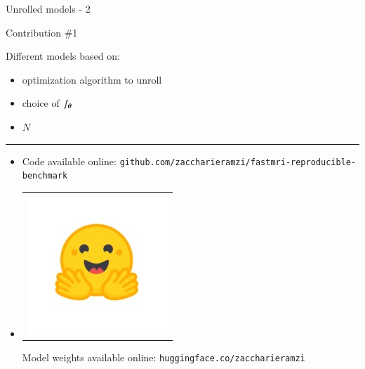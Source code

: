 \begin{frame}{Unrolled models - 2}
    \begin{exampleblock}{Contribution \#1}
    \end{exampleblock}
    Different models based on:
    \begin{itemize}
        \item optimization algorithm to unroll
        \item choice of $f_{{\boldsymbol{\theta}}}$
        \item $N$
    \end{itemize}


    \noindent\rule{\textwidth}{1pt}

        \begin{itemize}
            \item {} Code available online: \texttt{github.com/zaccharieramzi/fastmri-reproducible-benchmark}
            \item\begin{tabular}{@{}c@{}}\includegraphics[width=3ex]{Figures/hf_logo.jpeg}\end{tabular}Model weights available online: \texttt{huggingface.co/zaccharieramzi}
        \end{itemize}



\end{frame}


